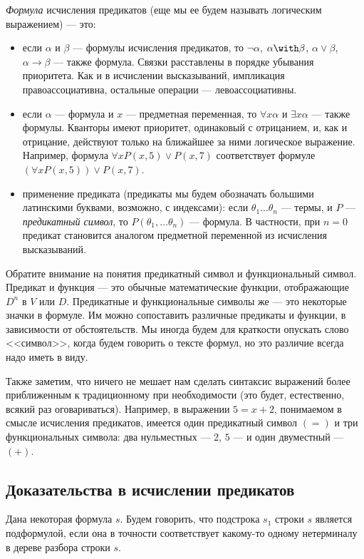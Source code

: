 \begin{definition}\emph{Формула} исчисления предикатов (еще мы ее будем
называть логическим выражением) --- это:
\begin{itemize}
\item если $\alpha$ и $\beta$ --- формулы исчисления предикатов, то 
$\neg \alpha$, $\alpha \with \beta$, $\alpha \vee \beta$, 
$\alpha \rightarrow \beta$ --- также формула. Связки расставлены
в порядке убывания приоритета. Как и в исчислении высказываний,
импликация правоассоциативна, остальные операции --- левоассоциативны.
\item если $\alpha$ --- формула и $x$ --- предметная переменная, то
$\forall x \alpha$ и $\exists x \alpha$ --- также формулы. Кванторы
имеют приоритет, одинаковый с отрицанием, и, как и отрицание, действуют 
только на ближайшее за ними логическое выражение. Например, формула 
$\forall x P(x,5) \vee P(x,7)$ соответствует формуле $(\forall x P(x,5)) \vee P(x,7)$.
\item применение предиката (предикаты мы будем обозначать большими
латинскими буквами, возможно, с индексами): если 
$\theta_1 \dots \theta_n$ --- термы, и $P$ --- \emph{предикатный символ}, 
то $P (\theta_1, \dots \theta_n)$ --- формула. В частности, при $n=0$
предикат становится аналогом предметной переменной из исчисления высказываний.
\end{itemize}
\end{definition}

Обратите внимание на понятия предикатный символ и функциональный символ.
Предикат и функция --- это обычные математические функции, отображающие
$D^n$ в $V$ или $D$. Предикатные и функциональные символы же --- это 
некоторые значки в формуле. Им можно сопоставить различные предикаты и 
функции, в зависимости от обстоятельств. Мы иногда будем для краткости
опускать слово <<символ>>, когда будем говорить о тексте формул, но 
это различие всегда надо иметь в виду.

Также заметим, что ничего не мешает нам сделать синтаксис выражений более
приближенным к традиционному при необходимости (это будет, естественно,
всякий раз оговариваться). Например, в выражении $5 = x+2$, понимаемом в
смысле исчисления предикатов, имеется один предикатный символ $(=)$ и
три функциональных символа: два нульместных --- $2$, $5$ --- и один 
двуместный --- $(+)$.

\subsection{Доказательства в исчислении предикатов}
\begin{definition}Дана некоторая формула $s$.
Будем говорить, что подстрока $s_1$ строки $s$ является подформулой, 
если она в точности соответствует какому-то одному нетерминалу
в дереве разбора строки $s$.\end{definition}

